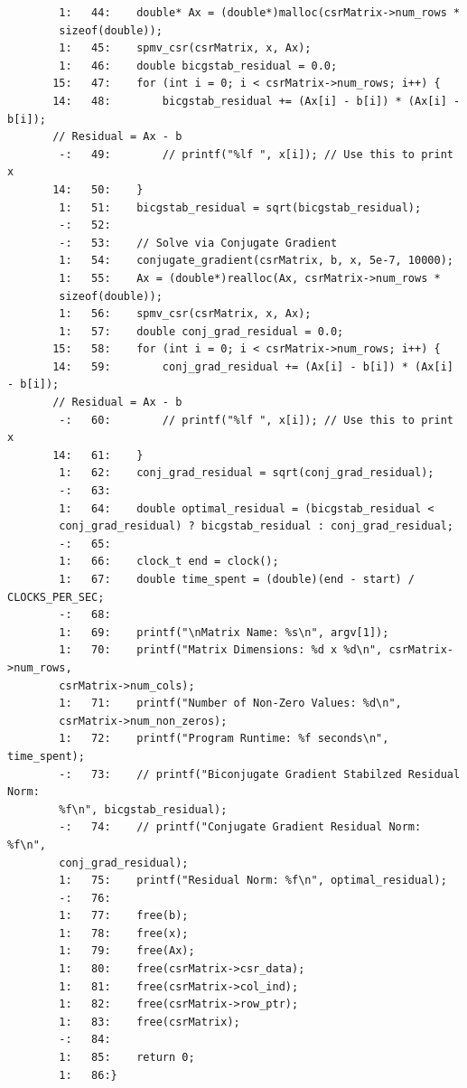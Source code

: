 \documentclass[12pt]{article}
\begin{document}
\begin{mdframed}[style=myboxstyleTerminal1]
\begin{verbatim}
        1:   44:    double* Ax = (double*)malloc(csrMatrix->num_rows * 
        sizeof(double));
        1:   45:    spmv_csr(csrMatrix, x, Ax);
        1:   46:    double bicgstab_residual = 0.0;
       15:   47:    for (int i = 0; i < csrMatrix->num_rows; i++) {
       14:   48:        bicgstab_residual += (Ax[i] - b[i]) * (Ax[i] - b[i]); 
       // Residual = Ax - b
        -:   49:        // printf("%lf ", x[i]); // Use this to print x
       14:   50:    }
        1:   51:    bicgstab_residual = sqrt(bicgstab_residual);
        -:   52:
        -:   53:    // Solve via Conjugate Gradient
        1:   54:    conjugate_gradient(csrMatrix, b, x, 5e-7, 10000);
        1:   55:    Ax = (double*)realloc(Ax, csrMatrix->num_rows * 
        sizeof(double));
        1:   56:    spmv_csr(csrMatrix, x, Ax);
        1:   57:    double conj_grad_residual = 0.0;
       15:   58:    for (int i = 0; i < csrMatrix->num_rows; i++) {
       14:   59:        conj_grad_residual += (Ax[i] - b[i]) * (Ax[i] - b[i]); 
       // Residual = Ax - b
        -:   60:        // printf("%lf ", x[i]); // Use this to print x
       14:   61:    }
        1:   62:    conj_grad_residual = sqrt(conj_grad_residual);
        -:   63:
        1:   64:    double optimal_residual = (bicgstab_residual < 
        conj_grad_residual) ? bicgstab_residual : conj_grad_residual;
        -:   65:
        1:   66:    clock_t end = clock();
        1:   67:    double time_spent = (double)(end - start) / CLOCKS_PER_SEC;
        -:   68:
        1:   69:    printf("\nMatrix Name: %s\n", argv[1]);
        1:   70:    printf("Matrix Dimensions: %d x %d\n", csrMatrix->num_rows, 
        csrMatrix->num_cols);
        1:   71:    printf("Number of Non-Zero Values: %d\n", 
        csrMatrix->num_non_zeros);
        1:   72:    printf("Program Runtime: %f seconds\n", time_spent);
        -:   73:    // printf("Biconjugate Gradient Stabilzed Residual Norm: 
        %f\n", bicgstab_residual);
        -:   74:    // printf("Conjugate Gradient Residual Norm: %f\n", 
        conj_grad_residual);
        1:   75:    printf("Residual Norm: %f\n", optimal_residual);
        -:   76:
        1:   77:    free(b);
        1:   78:    free(x);
        1:   79:    free(Ax);
        1:   80:    free(csrMatrix->csr_data);
        1:   81:    free(csrMatrix->col_ind);
        1:   82:    free(csrMatrix->row_ptr);
        1:   83:    free(csrMatrix);
        -:   84:
        1:   85:    return 0;
        1:   86:}
		\end{verbatim}
	\end{mdframed}
\end{document}
